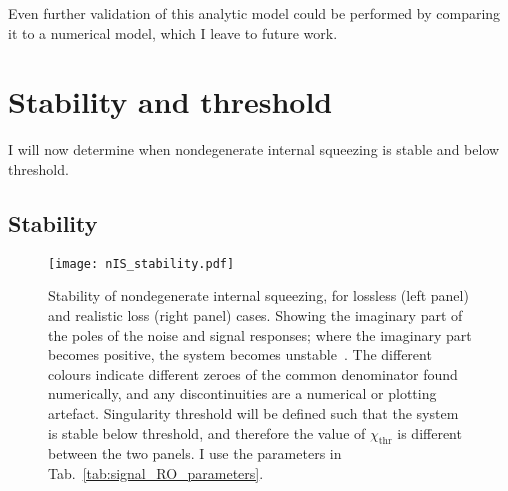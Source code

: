 Even further validation of this analytic model could be performed by comparing it to a numerical model, which I leave to future work.


\section{Stability and threshold}
\label{sec:stability_and_threshold}

I will now determine when nondegenerate internal squeezing is stable and below threshold. %

\subsection{Stability}
\label{sec:nIS_stability}

\begin{figure}[ht]
    \centering
    \texttt{[image: nIS\_stability.pdf]}
    \caption{Stability of nondegenerate internal squeezing, for lossless (left panel) and realistic loss (right panel) cases. Showing the imaginary part of the poles of the noise and signal responses; where the imaginary part becomes positive, the system becomes unstable~\cite{}. The different colours indicate different zeroes of the common denominator found numerically, and any discontinuities are a numerical or plotting artefact. Singularity threshold will be defined such that the system is stable below threshold, and therefore the value of $\chi_\text{thr}$ is different between the two panels. I use the parameters in Tab.~\ref{tab:signal_RO_parameters}.}
    \label{fig:nIS_stability}
\end{figure}

